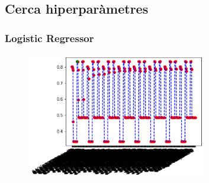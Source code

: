 \documentclass[a4paper, 11pt]{article}
\begin{document}
\newpage
\begin{figure}[h]
 \centering
\end{figure}

\newpage
\subsection{Cerca hiperparàmetres}
\subsubsection{Logistic Regressor}\label{hiper_logistic}
\begin{figure}[h]
    \includegraphics[width=0.7\textwidth]{LosQueFaltan/crosval_logistic.png}
\end{figure}
\newpage
\end{document}
